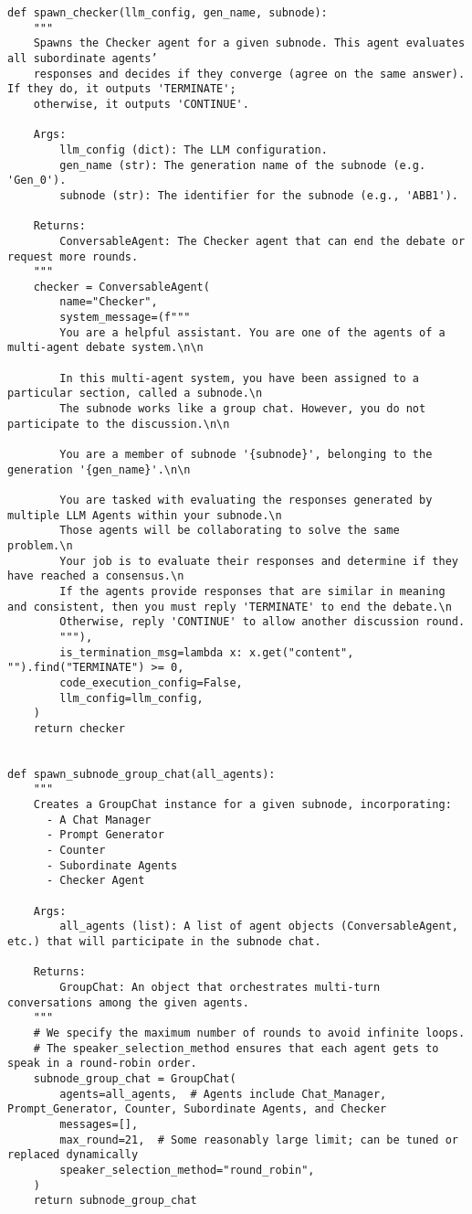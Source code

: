 \begin{lstlisting}
def spawn_checker(llm_config, gen_name, subnode):
    """
    Spawns the Checker agent for a given subnode. This agent evaluates all subordinate agents’
    responses and decides if they converge (agree on the same answer). If they do, it outputs 'TERMINATE';
    otherwise, it outputs 'CONTINUE'.

    Args:
        llm_config (dict): The LLM configuration.
        gen_name (str): The generation name of the subnode (e.g. 'Gen_0').
        subnode (str): The identifier for the subnode (e.g., 'ABB1').

    Returns:
        ConversableAgent: The Checker agent that can end the debate or request more rounds.
    """
    checker = ConversableAgent(
        name="Checker",
        system_message=(f"""
        You are a helpful assistant. You are one of the agents of a multi-agent debate system.\n\n

        In this multi-agent system, you have been assigned to a particular section, called a subnode.\n
        The subnode works like a group chat. However, you do not participate to the discussion.\n\n

        You are a member of subnode '{subnode}', belonging to the generation '{gen_name}'.\n\n

        You are tasked with evaluating the responses generated by multiple LLM Agents within your subnode.\n
        Those agents will be collaborating to solve the same problem.\n
        Your job is to evaluate their responses and determine if they have reached a consensus.\n
        If the agents provide responses that are similar in meaning and consistent, then you must reply 'TERMINATE' to end the debate.\n
        Otherwise, reply 'CONTINUE' to allow another discussion round.
        """),
        is_termination_msg=lambda x: x.get("content", "").find("TERMINATE") >= 0,
        code_execution_config=False,
        llm_config=llm_config,
    )
    return checker


def spawn_subnode_group_chat(all_agents):
    """
    Creates a GroupChat instance for a given subnode, incorporating:
      - A Chat Manager
      - Prompt Generator
      - Counter
      - Subordinate Agents
      - Checker Agent

    Args:
        all_agents (list): A list of agent objects (ConversableAgent, etc.) that will participate in the subnode chat.

    Returns:
        GroupChat: An object that orchestrates multi-turn conversations among the given agents.
    """
    # We specify the maximum number of rounds to avoid infinite loops.
    # The speaker_selection_method ensures that each agent gets to speak in a round-robin order.
    subnode_group_chat = GroupChat(
        agents=all_agents,  # Agents include Chat_Manager, Prompt_Generator, Counter, Subordinate Agents, and Checker
        messages=[],
        max_round=21,  # Some reasonably large limit; can be tuned or replaced dynamically
        speaker_selection_method="round_robin",
    )
    return subnode_group_chat



\end{lstlisting}
